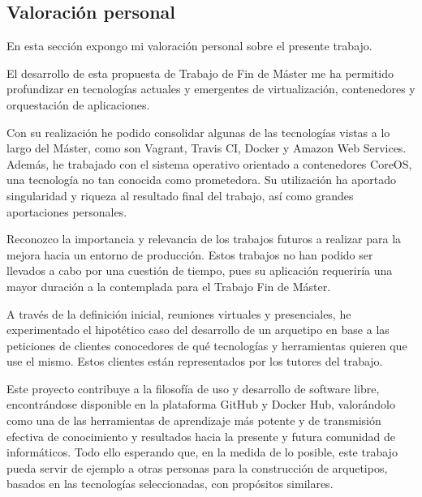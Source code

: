 \subsection{Valoración personal}

En esta sección expongo mi valoración personal sobre el presente trabajo.

El desarrollo de esta propuesta de Trabajo de Fin de Máster me ha permitido profundizar en tecnologías actuales y emergentes de virtualización, contenedores y orquestación de aplicaciones.

Con su realización he podido consolidar algunas de las tecnologías vistas a lo largo del Máster, como son Vagrant, Travis CI, Docker y Amazon Web Services. Además, he trabajado con el sistema operativo orientado a contenedores CoreOS, una tecnología no tan conocida como prometedora. Su utilización ha aportado singularidad y riqueza al resultado final del trabajo, así como grandes aportaciones personales.

Reconozco la importancia y relevancia de los trabajos futuros a realizar para la mejora hacia un entorno de producción. Estos trabajos no han podido ser llevados a cabo por una cuestión de tiempo, pues su aplicación requeriría una mayor duración a la contemplada para el Trabajo Fin de Máster.

A través de la definición inicial, reuniones virtuales y presenciales, he experimentado el hipotético caso del desarrollo de un arquetipo en base a las peticiones de clientes conocedores de qué tecnologías y herramientas quieren que use el mismo. Estos clientes están representados por los tutores del trabajo. 

Este proyecto contribuye a la filosofía de uso y desarrollo de software libre, encontrándose disponible en la plataforma GitHub y Docker Hub, valorándolo como una de las herramientas de aprendizaje más potente y de transmisión efectiva de conocimiento y resultados hacia la presente y futura comunidad de informáticos. Todo ello esperando que, en la medida de lo posible, este trabajo pueda servir de ejemplo a otras personas para la construcción de arquetipos, basados en las tecnologías seleccionadas, con propósitos similares.